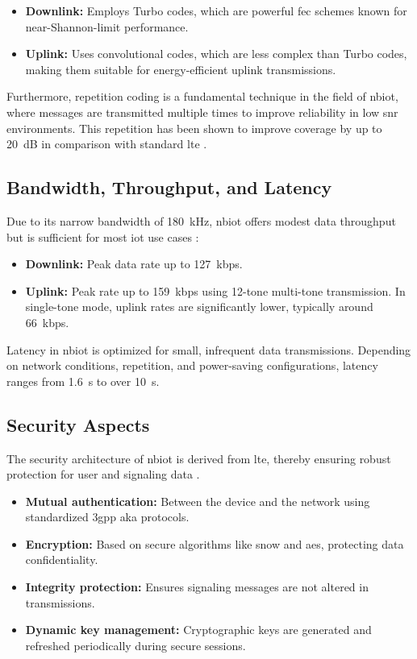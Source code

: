 \documentclass[12pt, english, openany]{book}
\begin{document}
\begin{itemize}
    \item \textbf{Downlink:} Employs Turbo codes, which are powerful \gls{fec} schemes known for near-Shannon-limit performance.
    \item \textbf{Uplink:} Uses convolutional codes, which are less complex than Turbo codes, making them suitable for energy-efficient uplink transmissions.
\end{itemize}

Furthermore, repetition coding is a fundamental technique in the field of \gls{nbiot}, where messages are transmitted multiple times to improve reliability in low \gls{snr} environments. This repetition has been shown to improve coverage by up to \SI{20}{dB} in comparison with standard \gls{lte} \parencite{NBIOT_SYSTEM}.

\subsection{Bandwidth, Throughput, and Latency}

Due to its narrow bandwidth of \SI{180}{kHz}, \gls{nbiot} offers modest data throughput but is sufficient for most \gls{iot} use cases \parencite{NBIOT_SYSTEM}:

\begin{itemize}
    \item \textbf{Downlink:} Peak data rate up to \SI{127}{kbps}.
    \item \textbf{Uplink:} Peak rate up to \SI{159}{kbps} using 12-tone multi-tone transmission. In single-tone mode, uplink rates are significantly lower, typically around \SI{66}{kbps}.
\end{itemize}

Latency in \gls{nbiot} is optimized for small, infrequent data transmissions. Depending on network conditions, repetition, and power-saving configurations, latency ranges from \SI{1.6}{s} to over \SI{10}{s}.

\subsection{Security Aspects}

The security architecture of \gls{nbiot} is derived from \gls{lte}, thereby ensuring robust protection for user and signaling data \parencite{NBIOT_WIKI}.

\begin{itemize}
    \item \textbf{Mutual authentication:} Between the device and the network using standardized \gls{3gpp} \gls{aka} protocols.
    \item \textbf{Encryption:} Based on secure algorithms like \gls{snow} and \gls{aes}, protecting data confidentiality.
    \item \textbf{Integrity protection:} Ensures signaling messages are not altered in transmissions.
    \item \textbf{Dynamic key management:} Cryptographic keys are generated and refreshed periodically during secure sessions.
\end{itemize}
\end{document}

